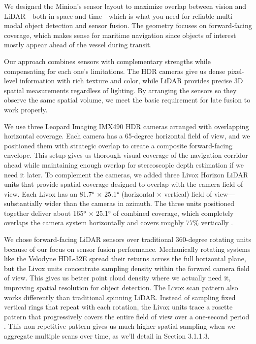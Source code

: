 \documentclass{erauthesis}
\begin{document}
We designed the Minion's sensor layout to maximize overlap between vision and \ac{LiDAR}—both in space and time—which is what you need for reliable multi-modal object detection and sensor fusion.
The geometry focuses on forward-facing coverage, which makes sense for maritime navigation since objects of interest mostly appear ahead of the vessel during transit.

Our approach combines sensors with complementary strengths while compensating for each one's limitations.
The \ac{HDR} cameras give us dense pixel-level information with rich texture and color, while \ac{LiDAR} provides precise 3D spatial measurements regardless of lighting.
By arranging the sensors so they observe the same spatial volume, we meet the basic requirement for late fusion to work properly.

We use three Leopard Imaging IMX490 \ac{HDR} cameras arranged with overlapping horizontal coverage.
Each camera has a 65-degree horizontal field of view, and we positioned them with strategic overlap to create a composite forward-facing envelope.
This setup gives us thorough visual coverage of the navigation corridor ahead while maintaining enough overlap for stereoscopic depth estimation if we need it later.
To complement the cameras, we added three Livox Horizon \ac{LiDAR} units that provide spatial coverage designed to overlap with the camera field of view.
Each Livox has an 81.7° × 25.1° (horizontal × vertical) field of view—substantially wider than the cameras in azimuth.
The three units positioned together deliver about 165° × 25.1° of combined coverage, which completely overlaps the camera system horizontally and covers roughly 77\% vertically \cite{thompson2023}.

We chose forward-facing \ac{LiDAR} sensors over traditional 360-degree rotating units because of our focus on sensor fusion performance.
Mechanically rotating systems like the Velodyne HDL-32E spread their returns across the full horizontal plane, but the Livox units concentrate sampling density within the forward camera field of view.
This gives us better point cloud density where we actually need it, improving spatial resolution for object detection.
The Livox scan pattern also works differently than traditional spinning \ac{LiDAR}.
Instead of sampling fixed vertical rings that repeat with each rotation, the Livox units trace a rosette pattern that progressively covers the entire field of view over a one-second period \cite{thompson2023}.
This non-repetitive pattern gives us much higher spatial sampling when we aggregate multiple scans over time, as we'll detail in Section 3.1.1.3.
\end{document}
